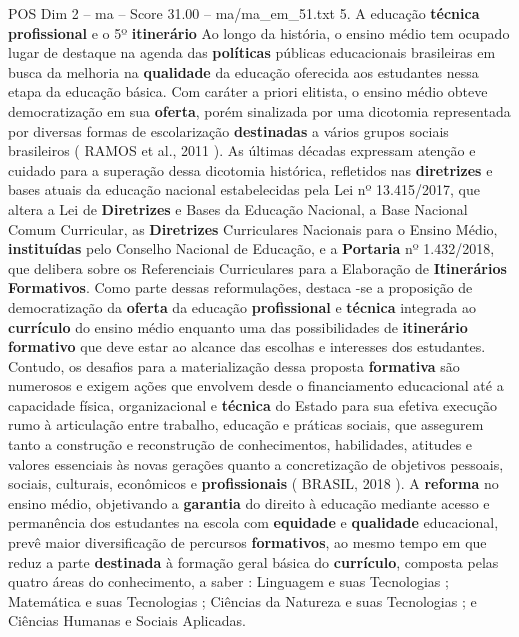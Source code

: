 \begin{textsample}{POS Dim 2 – ma – Score 31.00 – ma/ma\_em\_51.txt}  \label{ex:f2_pos_053}
5.
A educação \textbf{técnica} \textbf{profissional} e o 5º \textbf{itinerário} Ao longo da história, o ensino médio tem ocupado lugar de destaque na agenda das \textbf{políticas} públicas educacionais brasileiras em busca da melhoria na \textbf{qualidade} da educação oferecida aos estudantes nessa etapa da educação básica.
Com caráter a priori elitista, o ensino médio obteve democratização em sua \textbf{oferta}, porém sinalizada por uma dicotomia representada por diversas formas de escolarização \textbf{destinadas} a vários grupos sociais brasileiros ( RAMOS et al., 2011 ).
As últimas décadas expressam atenção e cuidado para a superação dessa dicotomia histórica, refletidos nas \textbf{diretrizes} e bases atuais da educação nacional estabelecidas pela Lei nº 13.415/2017, que altera a Lei de \textbf{Diretrizes} e Bases da Educação Nacional, a Base Nacional Comum Curricular, as \textbf{Diretrizes} Curriculares Nacionais para o Ensino Médio, \textbf{instituídas} pelo Conselho Nacional de Educação, e a \textbf{Portaria} nº 1.432/2018, que delibera sobre os Referenciais Curriculares para a Elaboração de \textbf{Itinerários} \textbf{Formativos}.
Como parte dessas reformulações, destaca -se a proposição de democratização da \textbf{oferta} da educação \textbf{profissional} e \textbf{técnica} integrada ao \textbf{currículo} do ensino médio enquanto uma das possibilidades de \textbf{itinerário} \textbf{formativo} que deve estar ao alcance das escolhas e interesses dos estudantes.
Contudo, os desafios para a materialização dessa proposta \textbf{formativa} são numerosos e exigem ações que envolvem desde o financiamento educacional até a capacidade física, organizacional e \textbf{técnica} do Estado para sua efetiva execução rumo à articulação entre trabalho, educação e práticas sociais, que assegurem tanto a construção e reconstrução de conhecimentos, habilidades, atitudes e valores essenciais às novas gerações quanto a concretização de objetivos pessoais, sociais, culturais, econômicos e \textbf{profissionais} ( BRASIL, 2018 ).
A \textbf{reforma} no ensino médio, objetivando a \textbf{garantia} do direito à educação mediante acesso e permanência dos estudantes na escola com \textbf{equidade} e \textbf{qualidade} educacional, prevê maior diversificação de percursos \textbf{formativos}, ao mesmo tempo em que reduz a parte \textbf{destinada} à formação geral básica do \textbf{currículo}, composta pelas quatro áreas do conhecimento, a saber : Linguagem e suas Tecnologias ; Matemática e suas Tecnologias ; Ciências da Natureza e suas Tecnologias ; e Ciências Humanas e Sociais Aplicadas.

\end{textsample}
